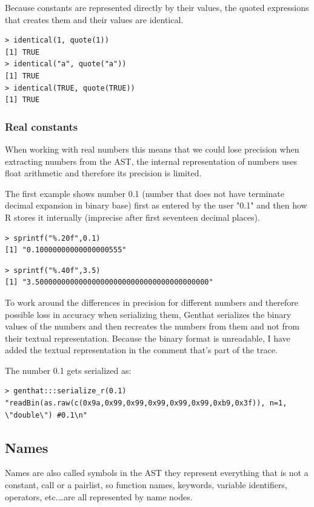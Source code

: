 \documentclass[thesis=B,english]{FITthesis}[2012/10/20]
\begin{document}
Because constants are represented directly by their values, the quoted expressions that creates them and their values are identical.

\begin{verbatim}
> identical(1, quote(1))
[1] TRUE
> identical("a", quote("a"))
[1] TRUE
> identical(TRUE, quote(TRUE))
[1] TRUE
\end{verbatim}

\subsubsection{Real constants}
When working with real numbers this means that we could lose precision when extracting numbers from the AST, the internal representation of numbers uses float arithmetic and therefore its precision is limited.

The first example shows number 0.1 (number that does not have terminate decimal expansion in binary base) first as entered by the user "0.1" and then how R stores it internally (imprecise after first seventeen decimal places).

\begin{verbatim}
> sprintf("%.20f",0.1)
[1] "0.10000000000000000555"
\end{verbatim}

\begin{verbatim}
> sprintf("%.40f",3.5)
[1] "3.5000000000000000000000000000000000000000"
\end{verbatim}

To work around the differences in precision for different numbers and therefore possible loss in accuracy when serializing them, Genthat serializes the binary values of the numbers and then recreates the numbers from them and not from their textual representation. Because the binary format is unreadable, I have added the textual representation in the comment that's part of the trace.

The number 0.1 gets serialized as:

\begin{verbatim}
> genthat:::serialize_r(0.1)
"readBin(as.raw(c(0x9a,0x99,0x99,0x99,0x99,0x99,0xb9,0x3f)), n=1, \"double\") #0.1\n"
\end{verbatim}

\subsection{Names}
Names are also called symbols in the AST they represent everything that is not a constant, call or a pairlist, so function names, keywords, variable identifiers, operators, etc.\ldots are all represented by name nodes.
\end{document}
